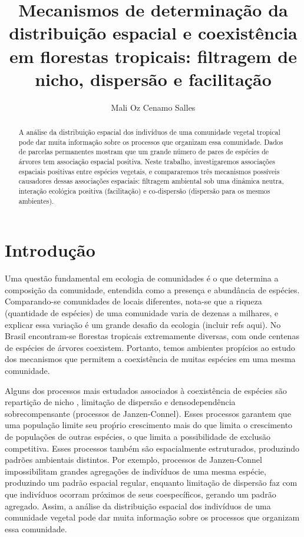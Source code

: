 \documentclass[twoside,12pt,a4paper]{report}
\begin{document}
\title{Mecanismos de determinação da distribuição espacial e coexistência em florestas tropicais:
filtragem de nicho, dispersão e facilitação}
\author{Mali Oz Cenamo Salles}


\begin{abstract}

A análise da distribuição espacial dos indivíduos de uma comunidade vegetal tropical pode dar muita
informação sobre os processos que organizam essa comunidade. Dados de parcelas permanentes mostram
que um grande número de pares de espécies de árvores tem associação espacial positiva. Neste
trabalho, investigaremos associações espaciais positivas entre espécies vegetais, e compararemos
três mecanismos possíveis causadores dessas associações espaciais: filtragem ambiental sob uma
dinâmica neutra, interação ecológica positiva (facilitação) e co-dispersão (dispersão para os mesmos
ambientes).

\end{abstract}

\section{Introdução}

Uma questão fundamental em ecologia de comunidades é o que determina a composição da
comunidade, entendida como a presença e abundância de espécies. Comparando-se comunidades de
locais diferentes, nota-se que a riqueza (quantidade de espécies) de uma comunidade varia de
dezenas a milhares, e explicar essa variação é um grande desafio da ecologia (incluir refs
aqui). No Brasil encontram-se florestas tropicais extremamente diversas, com onde centenas de
espécies de árvores coexistem. Portanto, temos ambientes propícios ao estudo dos mecanismos
que permitem a coexistência de muitas espécies em uma mesma comunidade.

Alguns dos processos mais estudados associados à coexistência de espécies são repartição de
nicho \citep{refs}, limitação de dispersão \citep{refs} e densodependência sobrecompensante
(processos de Janzen-Connel)\citep{refs}. 
Esses processos garantem que uma população limite seu proṕrio crescimento mais do que limita o
crescimento de populações de outras espécies, o que limita a possibilidade de exclusão
competitiva. 
Esses processos também são espacialmente
estruturados, produzindo padrões ambientais distintos. Por exemplo, processos de
Janzen-Connel impossibilitam grandes agregações de indivíduos de uma mesma espécie,
produzindo um padrão espacial regular, enquanto limitação de dispersão faz com que
indivíduos ocorram próximos de seus coespecíficos, gerando um padrão agregado.
Assim, a análise da distribuição espacial dos indivíduos de uma comunidade vegetal pode dar muita
informação sobre os processos que organizam essa comunidade. 
\end{document}
